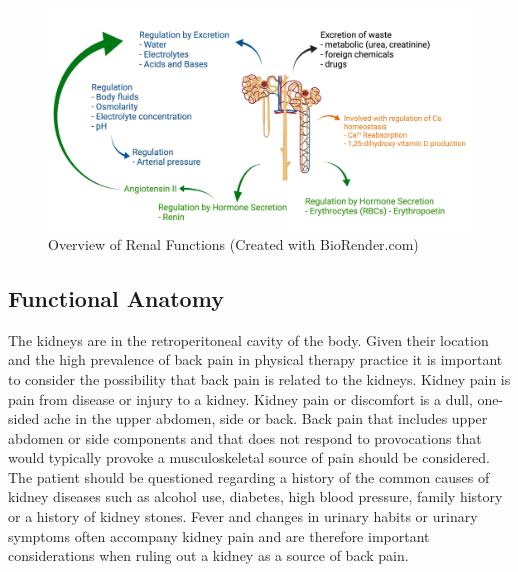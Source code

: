 \begin{figure}[!h]
    \centering
    \includegraphics[width=1.0\linewidth]{./figure/Renal_Functions.png}
    \caption{Overview of Renal Functions \footnotesize{(Created with BioRender.com)}}
    \label{fig:Renal_Functions}
\end{figure}

\subsection{Functional Anatomy}

The kidneys are in the retroperitoneal cavity of the body.  Given their location and the high prevalence of back pain in physical therapy practice it is important to consider the possibility that back pain is related to the kidneys. Kidney pain is pain from disease or injury to a kidney. Kidney pain or discomfort is a dull, one-sided ache in the upper abdomen, side or back. Back pain that includes upper abdomen or side components and that does not respond to provocations that would typically provoke a musculoskeletal source of pain should be considered. The patient should be questioned regarding a history of the common causes of kidney diseases such as alcohol use, diabetes, high blood pressure, family history or a history of kidney stones. Fever and changes in urinary habits or urinary symptoms often accompany kidney pain and are therefore important considerations when ruling out a kidney as a source of back pain.

